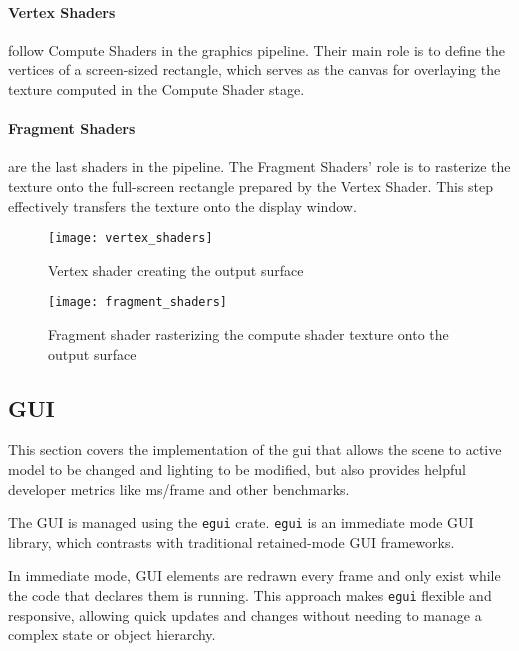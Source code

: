 \paragraph{Vertex Shaders} follow Compute Shaders in the graphics pipeline. Their main role is to define the vertices of a screen-sized rectangle, which serves as the canvas for overlaying the texture computed in the Compute Shader stage.
\paragraph{Fragment Shaders} are the last shaders in the pipeline. The Fragment Shaders' role is to rasterize the texture onto the full-screen rectangle prepared by the Vertex Shader. This step effectively transfers the texture onto the display window.
\begin{multicols}{2}
  \begin{figure}[H]
    \centering
    \texttt{[image: vertex\_shaders]}
    \caption{Vertex shader creating the output surface}
  \end{figure}

  \begin{figure}[H]
    \centering
    \texttt{[image: fragment\_shaders]}
    \caption{Fragment shader rasterizing the compute shader texture onto the output surface}
  \end{figure}
\end{multicols}

\subsection{GUI}

This section covers the implementation of the \acrshort{gui} that allows the scene to active model to be changed and lighting to be modified, but also provides helpful developer metrics like ms/frame and other benchmarks.

The GUI is managed using the \verb|egui| crate\supercite{egui:doc}.
\verb|egui| is an immediate\supercite{im_gui} mode GUI library, which contrasts with traditional retained-mode GUI frameworks\supercite{im_vs_rt}.

In immediate mode, GUI elements are redrawn every frame and only exist while the code that declares them is running. This approach makes \verb|egui| flexible and responsive, allowing quick updates and changes without needing to manage a complex state or object hierarchy.

